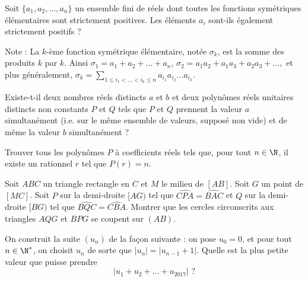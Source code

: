 \begin{exo}{}
Soit $\{a_1, a_2, \ldots, a_n\}$ un ensemble fini de réels dont toutes les fonctions symétriques élémentaires sont strictement positives. Les éléments $a_i$ sont-ils également strictement positifs ?

Note : La $k$-ème fonction symétrique élémentaire, notée $\sigma_k$, est la somme des produits $k$ par $k$. Ainsi
$\sigma_1 = a_1 + a_2 + \ldots+a_n$, $
\sigma_2 = a_1a_2 + a_1a_3 + a_2a_3 + \ldots ,$ et plus généralement, $\sigma_k = \sum_{1\leq i_1 < \ldots < i_k \leq n} a_{i_1}a_{i_2}\ldots a_{i_k}$.
\end{exo}

\begin{exo}{}
Existe-t-il deux nombres réels distincts $a$ et $b$ et deux polynômes réels unitaires distincts non constants $P$ et $Q$ tels que $P$ et $Q$ prennent la valeur $a$ simultanément (i.e. sur le même ensemble de valeurs, supposé non vide) et de même la valeur $b$ simultanément ?
\end{exo}


\begin{exo}{}
Trouver tous les polynômes $P$ à coefficients réels tels que, pour tout $n \in \N$, il existe un rationnel $r$ tel que $P(r)=n$.
\end{exo}


\begin{exo}{}
Soit $ABC$ un triangle rectangle en $C$ et $M$ le milieu de $[AB]$. Soit $G$ un point de $[MC]$. Soit $P$ sur la demi-droite $[AG)$ tel que $\widehat{CPA}=\widehat{BAC}$ et $Q$ sur la demi-droite $[BG)$ tel que $\widehat{BQC}=\widehat{CBA}$. Montrer que les cercles circonscrits aux triangles $AQG$ et $BPG$ se coupent sur $(AB)$.
\end{exo}

\begin{exo}{}
On construit la suite $(u_n)$ de la façon suivante : on pose $u_0=0$, et pour tout $n\in \N^*$, on choisit $u_n$ de sorte que $\vert u_n\vert = \vert u_{n-1}+1\vert$. Quelle est la plus petite valeur que puisse prendre
$$\vert u_1+u_2+\ldots+u_{2017}\vert \, \, ?$$
\end{exo}

